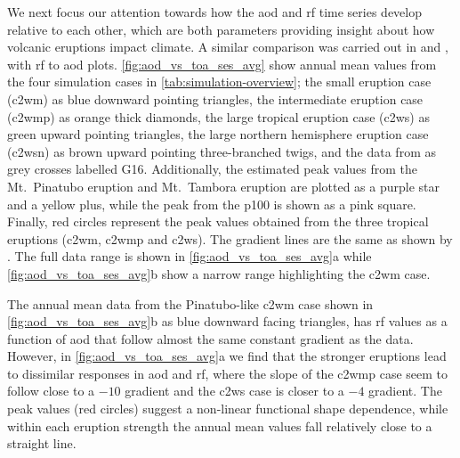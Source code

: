 \documentclass{ametsocV6.1}
\begin{document}
We next focus our attention towards how the \gls{aod} and \gls{rf} time series develop
relative to each other, which are both parameters providing insight about how volcanic
eruptions impact climate. A similar comparison was carried out in \citet[][their Fig.\
  4]{gregory2016} and \citet[][their Fig.\ 1]{marshall2020}, with \gls{rf} to \gls{aod}
plots. \ref{fig:aod_vs_toa_ses_avg} show annual mean values from the four simulation
cases in \ref{tab:simulation-overview}; the small eruption case (\gls{c2wm}) as blue
downward pointing triangles, the intermediate eruption case (\gls{c2wmp}) as orange
thick diamonds, the large tropical eruption case (\gls{c2ws}) as green upward pointing
triangles, the large northern hemisphere eruption case (\gls{c2wsn}) as brown upward
pointing three-branched twigs, and the data from \citet[][Fig.\ 4, black crosses from
  HadCM3 sstPiHistVol]{gregory2016} as grey crosses labelled G16. Additionally, the
estimated peak values from the Mt.\ Pinatubo eruption and Mt.\ Tambora eruption are
plotted as a purple star and a yellow plus, while the peak from the \gls{p100} is shown
as a pink square. Finally, red circles represent the peak values obtained from the three
tropical eruptions (\gls{c2wm}, \gls{c2wmp} and \gls{c2ws}). The gradient lines are the
same as shown by \citet{gregory2016}. The full data range is shown in
\ref{fig:aod_vs_toa_ses_avg}a while \ref{fig:aod_vs_toa_ses_avg}b show a narrow range
highlighting the \gls{c2wm} case.

The annual mean data from the Pinatubo-like \gls{c2wm} case shown in
\ref{fig:aod_vs_toa_ses_avg}b as blue downward facing triangles, has \gls{rf} values as
a function of \gls{aod} that follow almost the same constant gradient as the
\citet{gregory2016} data. However, in \ref{fig:aod_vs_toa_ses_avg}a we find that the
stronger eruptions lead to dissimilar responses in \gls{aod} and \gls{rf}, where the
slope of the \gls{c2wmp} case seem to follow close to a \(-10\) gradient and the
\gls{c2ws} case is closer to a \(-4\) gradient. The peak values (red circles) suggest a
non-linear functional shape dependence, while within each eruption strength the annual
mean values fall relatively close to a straight line.
\end{document}
